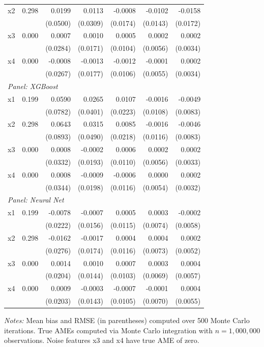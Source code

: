 \documentclass[conference]{IEEEtran}
\begin{document}
\begin{table}[htbp]
\begin{threeparttable}
\begin{tabular}{lrrrrrr}
				\quad x2 & 0.298 & 0.0199 & 0.0113 & -0.0008 & -0.0102 & -0.0158 \\
				&  & (0.0500) & (0.0309) & (0.0174) & (0.0143) & (0.0172) \\
				\quad x3 & 0.000 & 0.0007 & 0.0010 & 0.0005 & 0.0002 & 0.0002 \\
				&  & (0.0284) & (0.0171) & (0.0104) & (0.0056) & (0.0034) \\
				\quad x4 & 0.000 & -0.0008 & -0.0013 & -0.0012 & -0.0001 & 0.0002 \\
				&  & (0.0267) & (0.0177) & (0.0106) & (0.0055) & (0.0034) \\
				\midrule
				\multicolumn{7}{l}{\textit{Panel: XGBoost}} \\
				\quad x1 & 0.199 & 0.0590 & 0.0265 & 0.0107 & -0.0016 & -0.0049 \\
				&  & (0.0782) & (0.0401) & (0.0223) & (0.0108) & (0.0083) \\
				\quad x2 & 0.298 & 0.0643 & 0.0315 & 0.0085 & -0.0016 & -0.0046 \\
				&  & (0.0893) & (0.0490) & (0.0218) & (0.0116) & (0.0083) \\
				\quad x3 & 0.000 & 0.0008 & -0.0002 & 0.0006 & 0.0002 & 0.0002 \\
				&  & (0.0332) & (0.0193) & (0.0110) & (0.0056) & (0.0033) \\
				\quad x4 & 0.000 & 0.0008 & -0.0009 & -0.0006 & 0.0000 & 0.0002 \\
				&  & (0.0344) & (0.0198) & (0.0116) & (0.0054) & (0.0032) \\
				\midrule
				\multicolumn{7}{l}{\textit{Panel: Neural Net}} \\
				\quad x1 & 0.199 & -0.0078 & -0.0007 & 0.0005 & 0.0003 & -0.0002 \\
				&  & (0.0222) & (0.0156) & (0.0115) & (0.0074) & (0.0058) \\
				\quad x2 & 0.298 & -0.0162 & -0.0017 & 0.0004 & 0.0004 & 0.0002 \\
				&  & (0.0276) & (0.0174) & (0.0116) & (0.0073) & (0.0052) \\
				\quad x3 & 0.000 & 0.0014 & 0.0010 & 0.0007 & 0.0003 & 0.0004 \\
				&  & (0.0204) & (0.0144) & (0.0103) & (0.0069) & (0.0057) \\
				\quad x4 & 0.000 & 0.0009 & -0.0003 & -0.0007 & -0.0001 & 0.0004 \\
				&  & (0.0203) & (0.0143) & (0.0105) & (0.0070) & (0.0055) \\
				\bottomrule
			\end{tabular}
			\begin{tablenotes}
				\footnotesize
				\item \textit{Notes:} Mean bias and RMSE (in parentheses) computed over 500 Monte Carlo iterations. True AMEs computed via Monte Carlo integration with $n=1{,}000{,}000$ observations. Noise features x3 and x4 have true AME of zero.
			\end{tablenotes}
		\end{threeparttable}
	\end{table}
	
\end{document}
